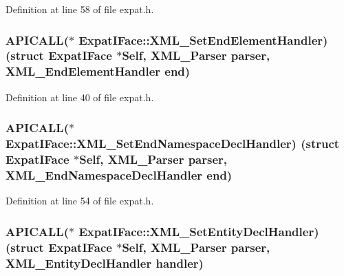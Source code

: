 Definition at line 58 of file expat.\+h.

\subsubsection[{\texorpdfstring{X\+M\+L\+\_\+\+Set\+End\+Element\+Handler}{XML_SetEndElementHandler}}]{ A\+P\+I\+C\+A\+LL($\ast$ Expat\+I\+Face\+::\+X\+M\+L\+\_\+\+Set\+End\+Element\+Handler) (struct {\bf Expat\+I\+Face} $\ast$Self, {\bf X\+M\+L\+\_\+\+Parser} parser, {\bf X\+M\+L\+\_\+\+End\+Element\+Handler} {\bf end})}\hypertarget{struct_expat_i_face_aea180ea9f7abbf676ed94939db6c507d}{}\label{struct_expat_i_face_aea180ea9f7abbf676ed94939db6c507d}


Definition at line 40 of file expat.\+h.

\subsubsection[{\texorpdfstring{X\+M\+L\+\_\+\+Set\+End\+Namespace\+Decl\+Handler}{XML_SetEndNamespaceDeclHandler}}]{ A\+P\+I\+C\+A\+LL($\ast$ Expat\+I\+Face\+::\+X\+M\+L\+\_\+\+Set\+End\+Namespace\+Decl\+Handler) (struct {\bf Expat\+I\+Face} $\ast$Self, {\bf X\+M\+L\+\_\+\+Parser} parser, {\bf X\+M\+L\+\_\+\+End\+Namespace\+Decl\+Handler} {\bf end})}\hypertarget{struct_expat_i_face_af67206d71c6b234687300cb4a48fc788}{}\label{struct_expat_i_face_af67206d71c6b234687300cb4a48fc788}


Definition at line 54 of file expat.\+h.

\subsubsection[{\texorpdfstring{X\+M\+L\+\_\+\+Set\+Entity\+Decl\+Handler}{XML_SetEntityDeclHandler}}]{ A\+P\+I\+C\+A\+LL($\ast$ Expat\+I\+Face\+::\+X\+M\+L\+\_\+\+Set\+Entity\+Decl\+Handler) (struct {\bf Expat\+I\+Face} $\ast$Self, {\bf X\+M\+L\+\_\+\+Parser} parser, {\bf X\+M\+L\+\_\+\+Entity\+Decl\+Handler} handler)}\hypertarget{struct_expat_i_face_aaeb8356728f53b540425a496b96a3555}{}\label{struct_expat_i_face_aaeb8356728f53b540425a496b96a3555}


